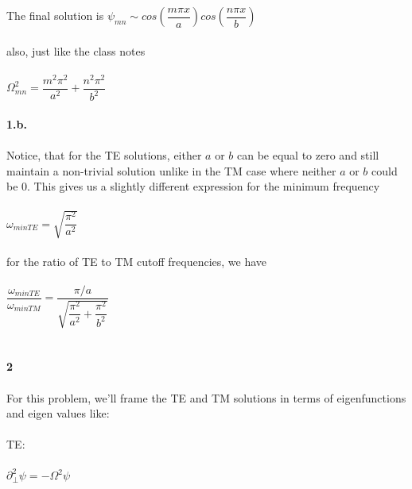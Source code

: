 \documentclass[prb,preprint]
{revtex4-1}
\newcommand{\PRLsep}{\noindent\makebox[\linewidth]{\resizebox{0.8888\linewidth}{2pt}{$\bullet$}}\bigskip}
\begin{document}
The final solution is 
$\psi_{mn} \sim cos\left(\dfrac{m\pi x}{a}\right)cos\left(\dfrac{n\pi x}{b}\right)$
\\
\\
also, just like the class notes
\\
\\
$\Omega^2_{mn} = \dfrac{m^2\pi^2}{a^2} + \dfrac{n^2\pi^2}{b^2}$
\\
\\
\textbf{1.b.}
\\
\\
Notice, that for the TE solutions, either $a$ or $b$ can be equal to zero and still maintain a non-trivial solution unlike in the TM case where neither $a$ or $b$ could be 0.  This gives us a slightly different expression for the minimum frequency 
\\
\\
$\omega_{minTE} = \sqrt{\dfrac{\pi^2}{a^2}}$
\\
\\
for the ratio of TE to TM cutoff frequencies, we have
\\
\\
$\dfrac{\omega_{minTE}}{\omega_{minTM}} = \dfrac{\pi/a}{\sqrt{\dfrac{\pi^2}{a^2} + \dfrac{\pi^2}{b^2}}}$
\\
\\
\PRLsep
\\
\newpage
\textbf{2}
\\
\\
For this problem, we'll frame the TE and TM solutions in terms of eigenfunctions and eigen values like:
\\
\\
TE:
\\
\\
$\partial_\perp^2 \psi = -\Omega^2 \psi$
\\
\\
\\
\\
\\
\\
\PRLsep
\\
\\

\end{document}
